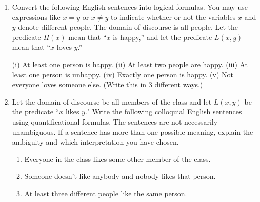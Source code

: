 \documentclass[12pt]{article}
\begin{document}
\begin{enumerate}

\item Convert the following English sentences into logical formulas. You may use expressions like $x=y$ or $x\neq y$ to indicate whether or not the variables $x$ and $y$ denote different people. The domain of discourse is all people. Let the predicate $H(x)$ mean that ``$x$ is happy,'' and let the predicate $L(x,y)$ mean that ``$x$ loves $y$.''

\subitem (i) At least one person is happy.
\subitem (ii) At least two people are happy.
\subitem (iii) At least one person is unhappy.
\subitem (iv) Exactly one person is happy.
\subitem (v) Not everyone loves someone else. (Write this in 3 different ways.)


\item Let the domain of discourse be all members of the class and let $L(x,y)$ be the predicate ``$x$ likes $y$." Write the following colloquial English sentences using quantificational formulas. The sentences are not necessarily unambiguous. If a sentence has more than one possible meaning, explain the ambiguity and which interpretation you have chosen.

\begin{enumerate}

\item Everyone in the class likes some other member of the class.

\item Someone doesn't like anybody and nobody likes that person.

\item At least three different people like the same person.

\end{enumerate}



\end{enumerate}
\end{document}
